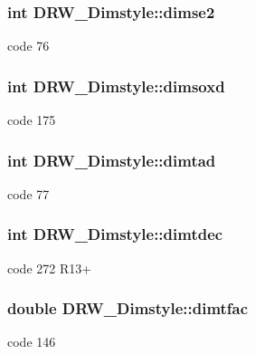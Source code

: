 \subsubsection[{dimse2}]{\setlength{\rightskip}{0pt plus 5cm}int D\+R\+W\+\_\+\+Dimstyle\+::dimse2}\label{class_d_r_w___dimstyle_a216852cf21ff08714ec7ce33085a7d76}
code 76 \hypertarget{class_d_r_w___dimstyle_aeb06ebd1bd16306b336032f4b8c4a80a}{}
\subsubsection[{dimsoxd}]{\setlength{\rightskip}{0pt plus 5cm}int D\+R\+W\+\_\+\+Dimstyle\+::dimsoxd}\label{class_d_r_w___dimstyle_aeb06ebd1bd16306b336032f4b8c4a80a}
code 175 \hypertarget{class_d_r_w___dimstyle_a5d98411bf63dd31343050ee3b17778ef}{}
\subsubsection[{dimtad}]{\setlength{\rightskip}{0pt plus 5cm}int D\+R\+W\+\_\+\+Dimstyle\+::dimtad}\label{class_d_r_w___dimstyle_a5d98411bf63dd31343050ee3b17778ef}
code 77 \hypertarget{class_d_r_w___dimstyle_adf05a8cee69d5a24cff03bccb74fdaf0}{}
\subsubsection[{dimtdec}]{\setlength{\rightskip}{0pt plus 5cm}int D\+R\+W\+\_\+\+Dimstyle\+::dimtdec}\label{class_d_r_w___dimstyle_adf05a8cee69d5a24cff03bccb74fdaf0}
code 272 R13+ \hypertarget{class_d_r_w___dimstyle_af90d8887451dfd6c127d27baa014735a}{}
\subsubsection[{dimtfac}]{\setlength{\rightskip}{0pt plus 5cm}double D\+R\+W\+\_\+\+Dimstyle\+::dimtfac}\label{class_d_r_w___dimstyle_af90d8887451dfd6c127d27baa014735a}
code 146 \hypertarget{class_d_r_w___dimstyle_add00c697c40fbc99d7f33af58ac3a75b}{}
